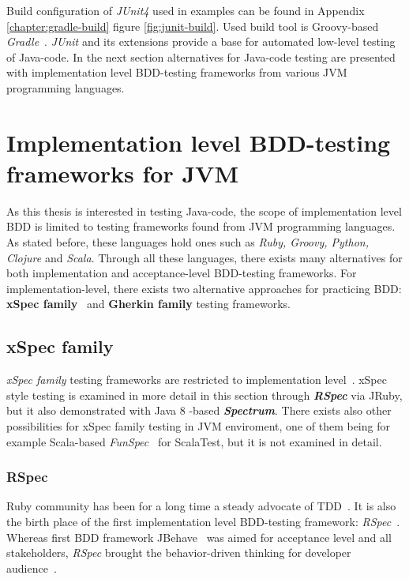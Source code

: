     Build configuration of \textit{JUnit4} used in examples can be found in Appendix \ref{chapter:gradle-build} figure \ref{fig:junit-build}.
    Used build tool is Groovy-based \textit{Gradle}~\cite{gradle}.
    \textit{JUnit} and its extensions provide a base for automated low-level testing of Java-code.
    In the next section alternatives for Java-code testing are presented with implementation level BDD-testing frameworks from
    various JVM programming languages.

\section{Implementation level BDD-testing frameworks for JVM}
    As this thesis is interested in testing Java-code, the scope of implementation level BDD is limited to testing frameworks
    found from JVM programming languages. As stated before, these languages hold ones such as \textit{Ruby, Groovy, Python,
    Clojure} and \textit{Scala}. Through all these languages, there exists many alternatives for both implementation and
    acceptance-level BDD-testing frameworks. For implementation-level, there exists two alternative approaches for practicing
    BDD: \textbf{xSpec family}~\cite{solis2011study} and \textbf{Gherkin family} testing frameworks.

    \subsection{xSpec family}
    \textit{xSpec family} testing frameworks are restricted to implementation level~\cite{solis2011study}. xSpec style testing
    is examined in more detail in this section through \textbf{\textit{RSpec}} via JRuby, but it also demonstrated with
    Java 8 -based \textbf{\textit{Spectrum}}. There exists also other possibilities for xSpec family testing in JVM enviroment,
    one of them being for example Scala-based \textit{FunSpec}~\cite{funspec} for ScalaTest, but it is not examined in detail.

    \subsubsection{RSpec}
    Ruby community has been for a long time a steady advocate of TDD~\cite{lerner2009forge}. It is also the birth place
    of the first implementation level BDD-testing framework: \textit{RSpec}~\cite{astels2006new}. Whereas first BDD framework
    JBehave~\cite{bdd2006north} was aimed for acceptance level and all stakeholders, \textit{RSpec} brought the behavior-driven thinking for developer
    audience~\cite{astels2006new}.

